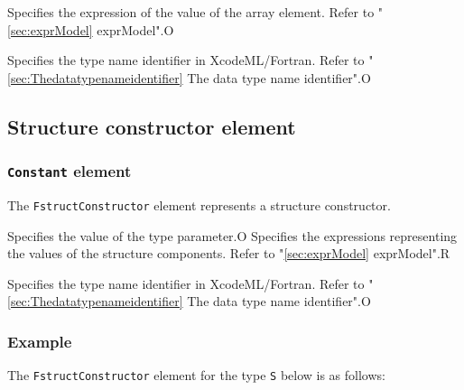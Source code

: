 \begin{XcodeMLChildElements}
{Specifies the expression of the value of the array element. Refer to "\ref{sec:exprModel} exprModel".}{O}
\end{XcodeMLChildElements}

\begin{XcodeMLAttributes}
{Specifies the type name identifier in XcodeML/Fortran.
 Refer to "\ref{sec:Thedatatypenameidentifier} The data type name identifier".}{O}
\end{XcodeMLAttributes}


\subsection{Structure constructor element}

\subsubsection{ {\tt Constant} element}

The {\tt FstructConstructor} element represents a structure constructor.


\begin{XcodeMLChildElements}
{Specifies the value of the type parameter.}{O}
{Specifies the expressions representing the values of the structure components. Refer to "\ref{sec:exprModel} exprModel".}{R}
\end{XcodeMLChildElements}

\begin{XcodeMLAttributes}
{Specifies the type name identifier in XcodeML/Fortran.
 Refer to "\ref{sec:Thedatatypenameidentifier} The data type name identifier".}{O}
\end{XcodeMLAttributes}

\subsubsection*{Example}

The {\tt FstructConstructor} element for the type {\tt S} below is as follows:
\vspace{2mm}

